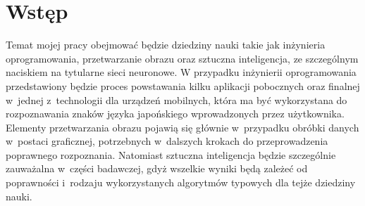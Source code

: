 \chapter{Wstęp}
\iffalse
Praca MUSI stanowić samodzielne opracowanie przez dyplomanta WYBRANEGO TEMATU BADAWCZEGO pod kierunkiem promotora. Temat i~zakres pracy powinien wiązać się ze specjalnością, na której studiuje dyplomant. Orientacyjna objętość pracy inżynierskiej / licencjackiej (I-go stopnia) to 50-80 stron, zaś pracy magisterskiej (II-go stopnia) -- 70-120 stron\footnote{Przy tworzeniu niniejszego szablonu wykorzystano fragmenty \cite{Nie10}}.

Wstęp rozprawy powinien jasno określać tematykę i~zakres podejmowanego problemu, np: \textit{Niniejsza praca dotyczy (inżynierii oprogramowania / sieci komputerowych / grafiki komputerowej / sztucznej inteligencji / algorytmów ewolucyjnych / technologii baz danych)... } Należy wskazać dlaczego dana tematyka została podjęta. Czy rozwiązania istniejące w~danej dziedzinie nie są wystarczające? Czy problem można rozwiązać inaczej? Czy podejmowany problem jest aktywnym tematem badawczym? Przed jakimi wyzwaniami stoi osoba podejmująca tematykę? Na tym etapie należy jedynie zarysować problem w~sposób ogólny -- na szczegółowe opisy będzie miejsce dalej.
\fi
Temat mojej pracy obejmować będzie dziedziny nauki takie jak inżynieria oprogramowania, przetwarzanie obrazu oraz sztuczna inteligencja, ze szczególnym naciskiem na tytularne sieci neuronowe. W przypadku inżynierii oprogramowania przedstawiony będzie proces powstawania kilku aplikacji pobocznych oraz finalnej w~jednej z~technologii dla urządzeń mobilnych, która ma być wykorzystana do rozpoznawania znaków języka japońskiego wprowadzonych przez użytkownika. Elementy przetwarzania obrazu pojawią się głównie w~przypadku obróbki danych w~postaci graficznej, potrzebnych w~dalszych krokach do przeprowadzenia poprawnego rozpoznania. Natomiast sztuczna inteligencja będzie szczególnie zauważalna w~części badawczej, gdyż wszelkie wyniki będą zależeć od poprawności i~rodzaju wykorzystanych algorytmów typowych dla tejże dziedziny nauki.

